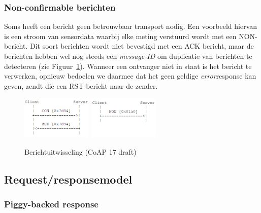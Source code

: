 \subsubsection{Non-confirmable berichten}

Soms heeft een bericht geen betrouwbaar transport nodig. Een voorbeeld hiervan is een stroom van sensordata waarbij elke meting verstuurd wordt met een NON-bericht. Dit soort berichten wordt niet bevestigd met een ACK bericht, maar de berichten hebben wel nog steeds een \textit{message-ID} om duplicatie van berichten te detecteren (zie Figuur~\ref{fig:berichtuitwisseling}). Wanneer een ontvanger niet in staat is het bericht te verwerken, opnieuw bedoelen we daarmee dat het geen geldige \textit{error}response kan geven, zendt die een RST-bericht naar de zender.

\begin{figure}[h]
\vspace{10pt}
\centering
{}
{\includegraphics[width=0.3\textwidth]{fig/CoAPConfirmable}}
\hspace{30pt}
{\includegraphics[width=0.3\textwidth]{fig/CoAPNonConfirmable}}
\caption{Berichtuitwisseling (CoAP 17 draft)}
\label{fig:berichtuitwisseling}
\end{figure}

\subsection{Request/responsemodel}

\subsubsection{Piggy-backed response}

